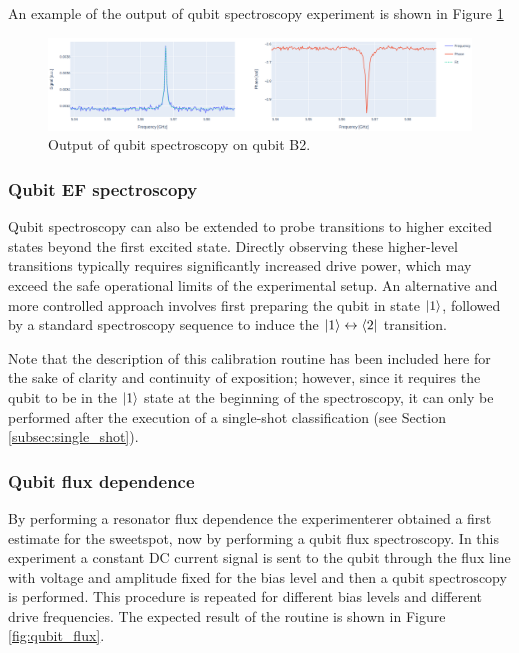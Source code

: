 An example of the output of qubit spectroscopy experiment is shown in Figure \ref{fig:qubit_spectroscopy}
\begin{figure}[h!]
    \centering
    \includegraphics[width=\textwidth]{figures/png/qubit_spectroscopy.png}
    \caption{Output of qubit spectroscopy on qubit B2.}
    \label{fig:qubit_spectroscopy}
\end{figure}

\subsubsection{Qubit EF spectroscopy}
Qubit spectroscopy can also be extended to probe transitions to higher excited states beyond the first excited state. 
Directly observing these higher-level transitions typically requires significantly increased drive power, which may exceed the safe operational limits of the experimental setup. 
An alternative and more controlled approach involves first preparing the qubit in state $\ket{1}$, followed by a standard spectroscopy sequence to induce the $\ket{1} \leftrightarrow \bra{2}$ transition. 


Note that the description of this calibration routine has been included here for the sake of clarity and continuity of exposition; however, since it requires the qubit to be in the $\ket{1}$ state at the beginning of the spectroscopy, it can only be performed after the execution of a single-shot classification (see Section \ref{subsec:single_shot}).

\subsubsection{Qubit flux dependence}
By performing a resonator flux dependence the experimenterer obtained a first estimate for the sweetspot, now by performing a qubit flux spectroscopy.
In this experiment a constant DC current signal is sent to the qubit through the flux line with voltage and amplitude fixed for the bias level and then a qubit spectroscopy is performed.
This procedure is repeated  for different bias levels and different drive frequencies.
The expected result of the routine is shown in Figure \ref{fig:qubit_flux}.

